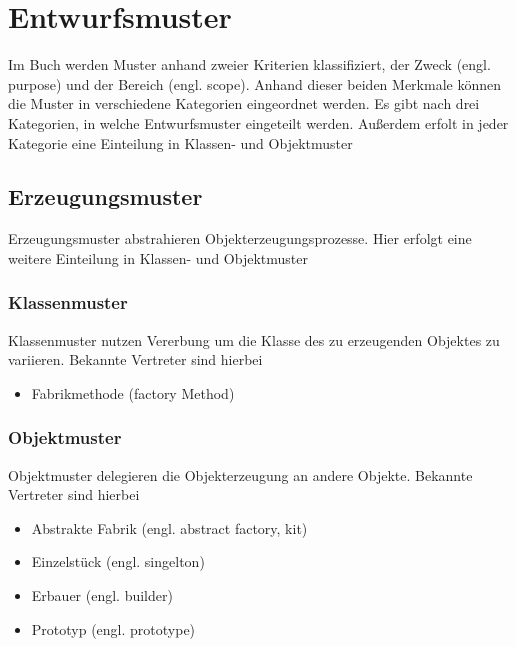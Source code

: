 
\chapter{Entwurfsmuster}
	Im Buch \cite{gamma1994design} werden Muster anhand zweier Kriterien klassifiziert, der Zweck (engl. purpose) und der Bereich (engl. scope). Anhand dieser beiden Merkmale können die Muster in verschiedene Kategorien eingeordnet werden. Es gibt nach \cite{gamma1994design} drei Kategorien, in welche Entwurfsmuster eingeteilt werden. Außerdem erfolt in jeder Kategorie eine Einteilung in Klassen- und Objektmuster
		
		\section{Erzeugungsmuster}
		Erzeugungsmuster abstrahieren Objekterzeugungsprozesse. Hier erfolgt eine weitere Einteilung in Klassen- und Objektmuster
			
			\subsection{Klassenmuster}
			Klassenmuster nutzen Vererbung um die Klasse des zu erzeugenden Objektes zu variieren. Bekannte Vertreter sind hierbei
			\begin{itemize}
				\item Fabrikmethode (factory Method)
			\end{itemize}
			
			\subsection{Objektmuster}
			Objektmuster delegieren die Objekterzeugung an andere Objekte. Bekannte Vertreter sind hierbei
			\begin{itemize}
				\item Abstrakte Fabrik (engl. abstract factory, kit)
				\item Einzelstück (engl. singelton)
				\item Erbauer (engl. builder)
				\item Prototyp (engl. prototype)
			\end{itemize}

